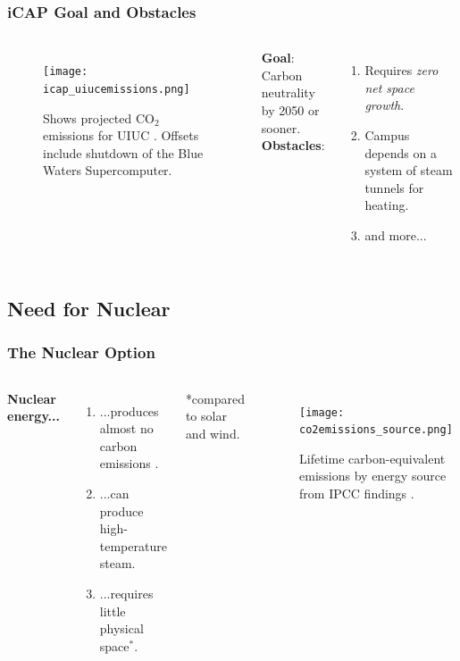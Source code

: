 \begin{frame}
  \frametitle{iCAP Goal and Obstacles}
  \begin{columns}
    \column[t]{5cm}
    \begin{figure}
      \centering
      \texttt{[image: icap\_uiucemissions.png]}
      \caption{Shows projected CO$_2$ emissions for UIUC \cite{isee_illinois_2015}. Offsets include shutdown of the Blue Waters Supercomputer.}
      \label{fig:co2projections}
    \end{figure}

    \column[t]{5cm}
    \textbf{Goal}:\\
    Carbon neutrality by 2050 or sooner.\\
    \vspace{1cm}
    \textbf{Obstacles}:\\
    \begin{enumerate}
      \item Requires \textit{zero net space growth}.
      \item Campus depends on a system of steam tunnels for heating.
      \item and more...
    \end{enumerate}
  \end{columns}
\end{frame}

\subsection{Need for Nuclear}
\begin{frame}
  \frametitle{The Nuclear Option}
  \begin{columns}
    \vspace{0.25cm}
    \column[t]{5cm}
      \textbf{Nuclear energy...}
      \vspace{0.25cm}
      \begin{enumerate}
        \item ...produces almost no carbon emissions \cite{intergovernmental_panel_on_climate_change_climate_2014}.
        \item ...can produce high-temperature steam.
        \item ...requires little physical space$^*$.
      \end{enumerate}
      \vspace{3cm}
      *compared to solar and wind.
    \column[t]{5cm}
    \begin{figure}
      \texttt{[image: co2emissions\_source.png]}
      \caption{Lifetime carbon-equivalent emissions by energy source from IPCC findings \cite{intergovernmental_panel_on_climate_change_climate_2014}.}
      \label{fig:co2source}
    \end{figure}
  \end{columns}
\end{frame}

